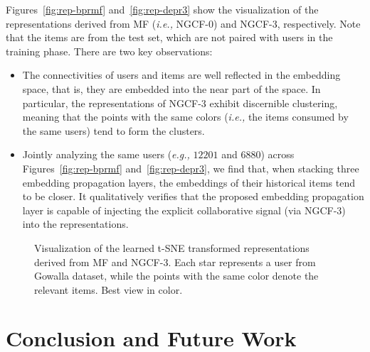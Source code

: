 \documentclass[sigconf]{acmart}
\newcommand{\ie}{\emph{i.e., }}
\newcommand{\eg}{\emph{e.g., }}
\theoremstyle{definition}
\begin{document}
Figures~\ref{fig:rep-bprmf} and~\ref{fig:rep-depr3} show the visualization of the representations derived from MF (\ie NGCF-0) and NGCF-3, respectively.
Note that the items are from the test set, which are not paired with users in the training phase.
There are two key observations:
\begin{itemize}[leftmargin=*]
\item The connectivities of users and items are well reflected in the embedding space, that is, they are embedded into the near part of the space.
In particular, the representations of NGCF-3 exhibit discernible clustering, meaning that the points with the same colors (\ie the items consumed by the same users) tend to form the clusters.

\item Jointly analyzing the same users (\eg $12201$ and $6880$) across Figures~\ref{fig:rep-bprmf} and~\ref{fig:rep-depr3}, we find that, when stacking three embedding propagation layers, the embeddings of their historical items tend to be closer.
It qualitatively verifies that the proposed embedding propagation layer is capable of injecting the explicit collaborative signal (via NGCF-3) into the representations.

\end{itemize}

\begin{figure}[t]
\centering
{}
\vspace{-10pt}
\caption{Visualization of the learned t-SNE transformed representations derived from MF and NGCF-3.
Each star represents a user from Gowalla dataset, while the points with the same color denote the relevant items. Best view in color.}
\label{fig:gamma-effect}\vspace{-15pt}
\end{figure} \section{Conclusion and Future Work}
\end{document}
